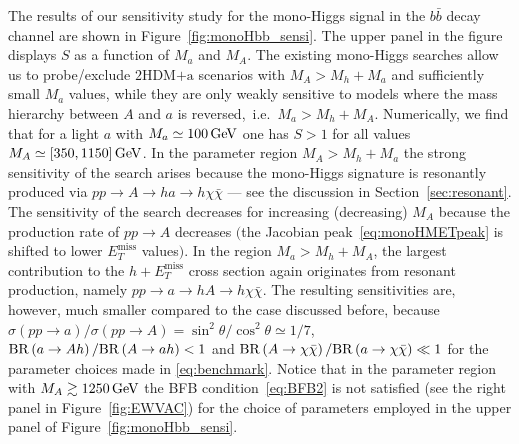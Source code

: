 \documentclass[a4paper, 11pt,notoc]{article}
\newcommand{\MET}{\ensuremath{E_T^\mathrm{miss}}\xspace}
\newcommand{\mA}{\ensuremath{M_{A}}\xspace}
\newcommand{\ma}{\ensuremath{M_{a}}\xspace}
\newcommand{\hdma}{\ensuremath{\textrm{2HDM+a}}\xspace}
\begin{document}
The results of our sensitivity study for the mono-Higgs signal in the $b \bar b$ decay channel are shown in Figure~\ref{fig:monoHbb_sensi}. The upper panel in the figure displays $S$  as a function of $\ma$ and $\mA$. The existing mono-Higgs searches allow us to probe/exclude \hdma scenarios with  $\mA > M_h + \ma$  and sufficiently small $\ma$ values, while they are only weakly  sensitive to models where the mass hierarchy between $A$ and $a$ is reversed,~i.e.~$\ma > M_h + \mA$. Numerically, we find that  for  a light $a$ with $\ma \simeq 100 \, {\rm GeV}$ one has $S > 1$ for all values $\mA \simeq [350, 1150] \, {\rm GeV}$. In the parameter region  $\mA > M_h + \ma$ the strong sensitivity of the search arises because the mono-Higgs signature is resonantly produced via $pp \to A \to ha \to h \chi \bar \chi$ --- see the discussion in Section~\ref{sec:resonant}. The sensitivity of the search decreases for increasing (decreasing) $M_A$ because the production rate of $pp \to A$  decreases $\big($the Jacobian peak~\eqref{eq:monoHMETpeak} is shifted to lower $\MET$ values$\big)$. In the region $\ma > M_h + \mA$, the largest contribution to the $h + \MET$ cross section again originates from resonant production, namely $pp \to a \to hA \to h \chi \bar \chi$.  The resulting sensitivities are, however, much smaller compared to the case discussed before, because  $\sigma \left (p p \to a \right )/\sigma \left (pp \to A \right ) = \sin^2 \theta/\cos^2 \theta \simeq 1/7$, ${\rm BR} \left ( a \to A h \right )/{\rm BR} \left (  A \to a h  \right ) < 1$ and ${\rm BR} \left ( A \to \chi \bar \chi \right )/{\rm BR} \left (  a \to \chi \bar \chi \right ) \ll~\!\!1$ for the parameter choices made in \eqref{eq:benchmark}. Notice that in the parameter region with $M_A \gtrsim 1250 \, {\rm GeV}$ the BFB condition~\eqref{eq:BFB2} is not satisfied (see the right panel in Figure~\ref{fig:EWVAC}) for the choice of parameters employed in the upper panel of Figure~\ref{fig:monoHbb_sensi}.
\end{document}
